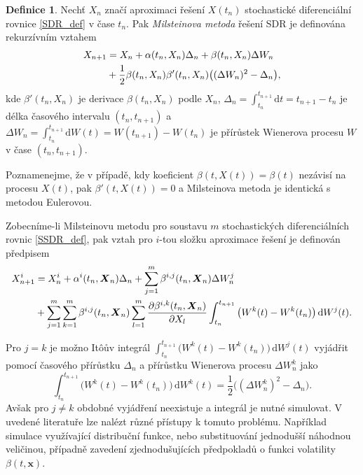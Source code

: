 \documentclass[a4paper,12pt]{report}
\theoremstyle{definition} \newtheorem{definice}[veta]{Definice}
\theoremstyle{remark}
\begin{document}
\begin{definice}\label{Milstein_def}
Nechť $X_n$ značí aproximaci řešení $X(t_{n})$ stochastické diferenciální rovnice \eqref{SDR_def} v čase $t_n$.
Pak \textit{Milsteinova metoda} řešení SDR je definována rekurzívním vztahem
\begin{align}\label{Milstein}
X_{n+1}&=X_n+\alpha(t_n,X_n)\Delta_n+\beta(t_n,X_n)\Delta W_n \\ \notag
&+\frac12\beta(t_n,X_n)\beta'(t_n,X_n)\big((\Delta W_n)^2-\Delta_n\big),
\end{align}
kde $\beta'(t_n,X_n)$ je derivace $\beta(t_n,X_n)$ podle $X_n$,
$\Delta_n=\int_{t_n}^{t_{n+1}}\mathrm{d}t=t_{n+1}-t_n$ je délka časového intervalu $(t_n,t_{n+1})$
a $\Delta W_n=\int_{t_n}^{t_{n+1}}\mathrm{d}W(t)=W(t_{n+1})-W(t_n)$ je přírůstek Wienerova procesu $W$ v čase $(t_n,t_{n+1})$.

Poznamenejme, že v případě, kdy koeficient $\beta(t,X(t))=\beta(t)$ nezávisí na procesu $X(t)$, pak $\beta'(t,X(t))=0$ a Milsteinova metoda je identická s metodou Eulerovou.

Zobecníme-li Milsteinovu metodu pro soustavu $m$ stochastických diferenciálních rovnic \eqref{SSDR_def}, pak vztah pro $i$-tou složku aproximace řešení je definován předpisem
\begin{align}\label{Milstein_soustava}
X_{n+1}^i&=X_n^i+\alpha^i(t_n,\boldsymbol{X}_n)\Delta_n+\sum_{j=1}^m\beta^{i,j}(t_n,\boldsymbol{X}_n)\Delta W_n^j \\ \notag 
&+\sum_{j=1}^m\sum_{k=1}^m\beta^{i,j}(t_n,\boldsymbol{X}_n)\sum_{l=1}^m\frac{\partial\beta^{i,k}(t_n,\boldsymbol{X}_n)}{\partial X_l}\int_{t_n}^{t_{n+1}}\big(W^k(t)-W^k(t_n)\big)\,\mathrm{d}W^j(t).
\end{align}
\end{definice}

Pro $j=k$ je možno It\^oův integrál $\int_{t_n}^{t_{n+1}}\big(W^k(t)-W^k(t_n)\big)\,\mathrm{d}W^j(t)$ vyjádřit pomocí časového přírůstku $\Delta_n$ a přírůstku Wienerova procesu $\Delta W^k_n$ jako 
$$\int_{t_n}^{t_{n+1}}\big(W^k(t)-W^k(t_n)\big)\,\mathrm{d}W^k(t)=\frac12\big((\Delta W^k_n)^2-\Delta_n\big).$$
Avšak pro $j\neq k$ obdobné vyjádření neexistuje a integrál je nutné simulovat.
V uvedené literatuře lze nalézt různé přístupy k tomuto problému.
Například simulace využívající distribuční funkce, nebo substituování jednodušší náhodnou veličinou, případně zavedení zjednodušujících předpokladů o funkci volatility $\beta(t,\boldsymbol{x})$.
\end{document}
